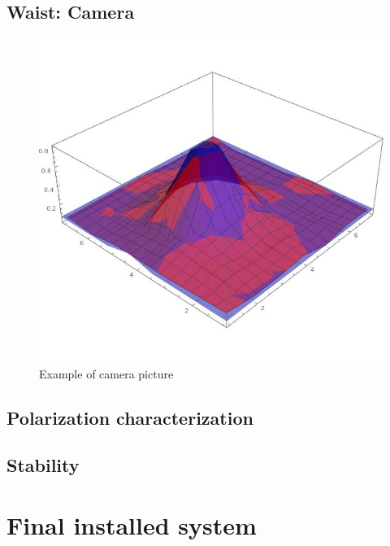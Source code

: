 \subsection{Waist: Camera}


\begin{figure}[H]
\centering
\includegraphics[width=\textwidth]{img/camera}
\caption{Example of camera picture}
\end{figure}
\subsection{Polarization characterization}
\subsection{Stability}
\section{Final installed system}
